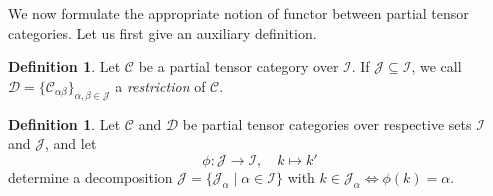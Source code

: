 \documentclass[11pt]{article}
\newcommand{\CatC}{\mathcal{C}}
\newcommand{\CatCC}{\mathscr{C}}
\newcommand{\CatDD}{\mathscr{D}}
\theoremstyle{definition}
\newtheorem{Def}[Theorem]{Definition}
\numberwithin{equation}{section}
\begin{document}
We now formulate the appropriate notion of functor between partial tensor categories. Let us first give an auxiliary definition.

\begin{Def} Let $\CatCC$ be a partial tensor category over $\mathscr{I}$. If $\mathscr{J}\subseteq \mathscr{I}$, we call $\CatDD = \{\CatC_{\alpha\beta}\}_{\alpha,\beta\in \mathscr{J}}$ a \emph{restriction} of $\CatCC$. 
\end{Def} 

\begin{Def} Let $\CatCC$ and $\CatDD$ be partial tensor categories over respective sets $\mathscr{I}$ and $\mathscr{J}$, and let \[\phi:\mathscr{J}\rightarrow \mathscr{I},\quad k \mapsto k'\] determine a decomposition $\mathscr{J} = \{\mathscr{J}_\alpha\mid \alpha\in \mathscr{I}\}$ with $k\in \mathscr{J}_\alpha \iff \phi(k)=\alpha$. 


\end{Def}
\end{document}
